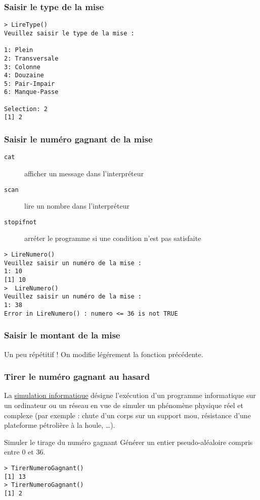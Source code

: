\documentclass[10pt]{beamer}
\begin{document}
\begin{frame}[fragile]
  \frametitle{Saisir le type de la mise}
  
  \begin{lstlisting}
> LireType()
Veuillez saisir le type de la mise :  

1: Plein
2: Transversale
3: Colonne
4: Douzaine
5: Pair-Impair
6: Manque-Passe

Selection: 2
[1] 2    
\end{lstlisting}

\end{frame}

\begin{frame}[fragile]
  \frametitle{Saisir le numéro gagnant de la mise}  
  \begin{description}
  \item[\texttt{cat}] afficher un message dans l'interpréteur
  \item[\texttt{scan}] lire un nombre dans l'interpréteur
  \item[\texttt{stopifnot}] arréter le programme si une condition n'est pas satisfaite
  \end{description}
  

  \begin{lstlisting}
> LireNumero()
Veuillez saisir un numéro de la mise :
1: 10
[1] 10
>  LireNumero()
Veuillez saisir un numéro de la mise :
1: 38
Error in LireNumero() : numero <= 36 is not TRUE      
\end{lstlisting}
\end{frame}


\begin{frame}[fragile]
  \frametitle{Saisir le montant de la mise}
  Un peu répétitif ! On modifie légérement la fonction précédente.
  
\end{frame}


\begin{frame}[fragile]
  \frametitle{Tirer le numéro gagnant au hasard}
    La \href{https://fr.wikipedia.org/wiki/Simulation_informatique}{simulation informatique} désigne l'exécution d'un programme informatique sur un ordinateur ou un réseau en vue de simuler un phénomène physique réel et complexe (par exemple : chute d’un corps sur un support mou, résistance d’une plateforme pétrolière à la houle, \dots).

    \begin{block}{Simuler le tirage du numéro gagnant}
      Générer un \alert{entier pseudo-aléaloire} compris entre 0 et 36.
    \end{block}
    
    \begin{lstlisting}
> TirerNumeroGagnant()
[1] 13
> TirerNumeroGagnant()
[1] 2
\end{lstlisting}
\end{frame}
\end{document}
